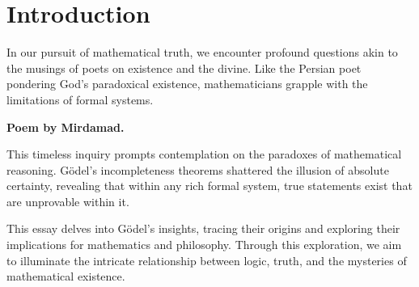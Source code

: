 \documentclass{article}
\begin{document}
\section{Introduction}
In our pursuit of mathematical truth, we encounter profound questions akin to the musings of poets on existence and the divine. Like the Persian poet pondering God's paradoxical existence, mathematicians grapple with the limitations of formal systems.



\begin{center}
\setlength{\fboxsep}{10pt}
\setlength{\fboxrule}{1pt}
\par\medskip
\textbf{\footnotesize{Poem by Mirdamad.}}
\end{center}

This timeless inquiry prompts contemplation on the paradoxes of mathematical reasoning. Gödel's incompleteness theorems shattered the illusion of absolute certainty, revealing that within any rich formal system, true statements exist that are unprovable within it.

This essay delves into Gödel's insights, tracing their origins and exploring their implications for mathematics and philosophy. Through this exploration, we aim to illuminate the intricate relationship between logic, truth, and the mysteries of mathematical existence.
\end{document}
